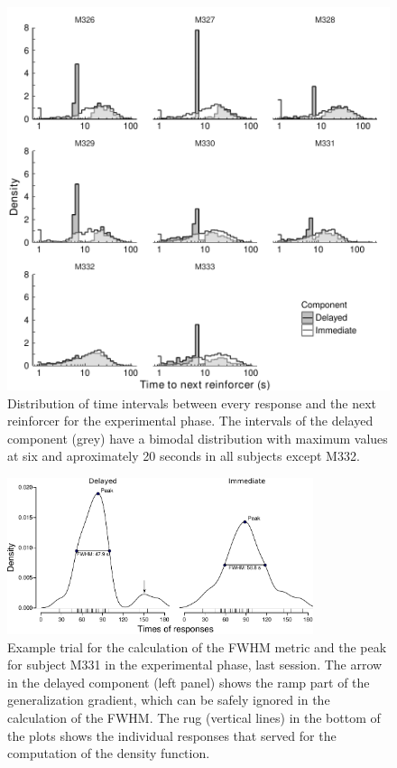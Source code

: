 \documentclass{article}
\begin{document}
\begin{figure}[ht]
	\centering
	\includegraphics[width=\textwidth]{SM_figure_4.pdf}
	\caption{Distribution of time intervals between every response and the next reinforcer for the experimental phase. The intervals of the delayed component (grey) have a bimodal distribution with maximum values at six and aproximately 20 seconds in all subjects except M332.}
\end{figure}

\begin{figure}[ht]
	\centering
	\includegraphics[width=0.8\textwidth]{SM_figure_5.pdf}
	\caption{Example trial for the calculation of the FWHM metric and the peak for subject M331 in the experimental phase, last session. The arrow in the delayed component (left panel) shows the ramp part of the generalization gradient, which can be safely ignored in the calculation of the FWHM. The rug (vertical lines) in the bottom of the plots shows the individual responses that served for the computation of the density function.}
\end{figure}
\end{document}
